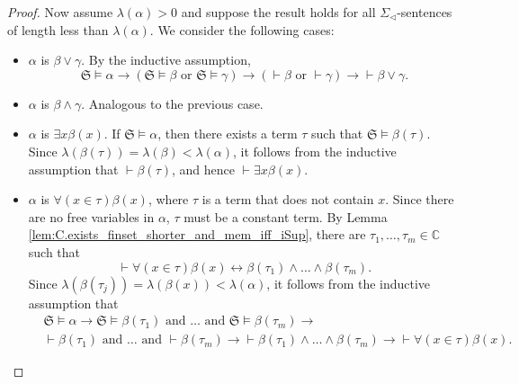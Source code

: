 \begin{proof}
    Now assume $\lambda(\alpha) > 0$ and suppose the result holds for all $\Sigma_{\lhd}$-sentences 
    of length less than $\lambda (\alpha)$.
    We consider the following cases:
    \begin{itemize}
        \item $\alpha$ is $\beta \lor \gamma$. By the inductive assumption,
        \begin{equation*}
            \mathfrak{S} \vDash \alpha \rightarrow 
            (\mathfrak{S} \vDash \beta \text{ or } \mathfrak{S} \vDash \gamma) \rightarrow
            (\vdash \beta \text{ or } \vdash \gamma) \rightarrow 
            \vdash \beta \lor \gamma.
        \end{equation*}
        \item $\alpha$ is $\beta \land \gamma$. Analogous to the previous case.
        \item $\alpha$ is $\exists x \beta (x)$.
        If $\mathfrak{S} \vDash \alpha$, then there exists a term $\tau$ such that
        $\mathfrak{S} \vDash \beta(\tau)$. 
        Since $\lambda(\beta(\tau)) = \lambda(\beta) < \lambda(\alpha)$, it follows from
        the inductive assumption that $\vdash \beta(\tau)$, 
        and hence $\vdash \exists x \beta (x)$.
        \item $\alpha$ is $\forall (x \in \tau) \beta(x)$, where $\tau$ is a term that does not
        contain $x$. Since there are no free variables in $\alpha$, $\tau$ must be a constant term.
        By Lemma \ref{lem:C.exists_finset_shorter_and_mem_iff_iSup}, there are 
        $\tau_1, \ldots, \tau_m \in \mathbb{C}$ such that
        $$
        \vdash \forall (x \in \tau) \beta(x) \leftrightarrow
        \beta(\tau_1) \land \ldots \land \beta(\tau_m).
        $$
        Since $\lambda(\beta(\tau_j)) = \lambda(\beta(x)) < \lambda(\alpha)$, it follows 
        from the inductive assumption that
        \begin{equation*}
            \begin{split}
                & \mathfrak{S} \vDash \alpha \rightarrow 
                \mathfrak{S} \vDash \beta(\tau_1) \text{ and } \ldots \text{ and } 
                \mathfrak{S} \vDash \beta(\tau_m) \rightarrow \\
                &\vdash \beta(\tau_1) \text{ and } \ldots \text{ and } \vdash \beta(\tau_m) 
                \rightarrow
                \vdash \beta(\tau_1) \land \ldots \land \beta(\tau_m) \rightarrow
                \vdash \forall (x \in \tau) \beta(x).
            \end{split}
        \end{equation*}
    \end{itemize}
\end{proof}
